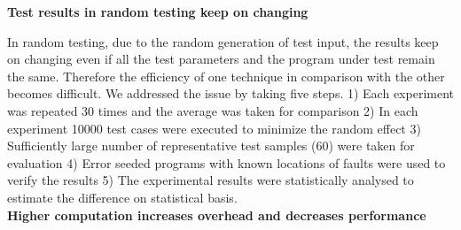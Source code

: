 








\textbf{Test results in random testing keep on changing} 

In random testing, due to the random generation of test input, the results keep on changing even if all the test parameters and the program under test remain the same. Therefore the efficiency of one technique in comparison with the other becomes difficult. We addressed  the issue by taking five steps. 1) Each experiment was repeated 30 times and the average was taken for comparison 2) In each experiment 10000 test cases were executed to minimize the random effect 3) Sufficiently large number of representative test samples (60) were taken for evaluation 4) Error seeded programs with known locations of faults were used to verify the results 5) The experimental results were statistically analysed to estimate the difference on statistical basis.\\


   
\textbf{Higher computation increases overhead and decreases performance}

